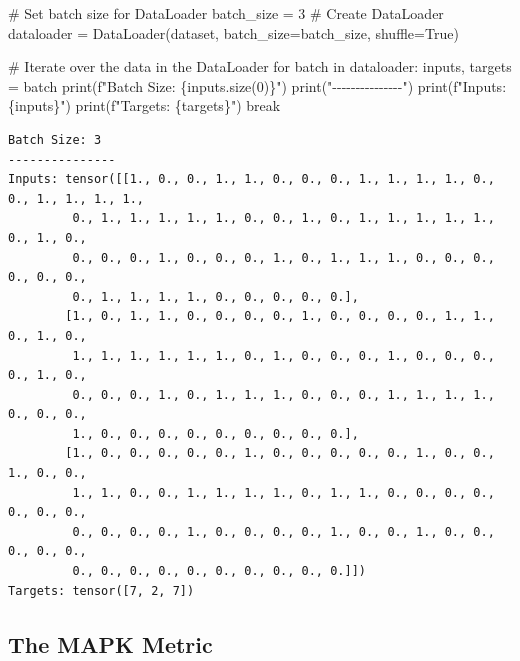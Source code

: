 \documentclass[
  letterpaper,
  DIV=11,
  numbers=noendperiod]{scrreprt}
\newenvironment{Shaded}{\begin{snugshade}}{\end{snugshade}}
\newcommand{\BuiltInTok}[1]{\textcolor[rgb]{0.00,0.23,0.31}{#1}}
\newcommand{\CommentTok}[1]{\textcolor[rgb]{0.37,0.37,0.37}{#1}}
\newcommand{\ControlFlowTok}[1]{\textcolor[rgb]{0.00,0.23,0.31}{#1}}
\newcommand{\DecValTok}[1]{\textcolor[rgb]{0.68,0.00,0.00}{#1}}
\newcommand{\KeywordTok}[1]{\textcolor[rgb]{0.00,0.23,0.31}{#1}}
\newcommand{\NormalTok}[1]{\textcolor[rgb]{0.00,0.23,0.31}{#1}}
\newcommand{\OperatorTok}[1]{\textcolor[rgb]{0.37,0.37,0.37}{#1}}
\newcommand{\SpecialCharTok}[1]{\textcolor[rgb]{0.37,0.37,0.37}{#1}}
\newcommand{\SpecialStringTok}[1]{\textcolor[rgb]{0.13,0.47,0.30}{#1}}
\newcommand{\StringTok}[1]{\textcolor[rgb]{0.13,0.47,0.30}{#1}}
\newcommand{\VariableTok}[1]{\textcolor[rgb]{0.07,0.07,0.07}{#1}}
\begin{document}
\begin{Shaded}
\begin{Highlighting}[]
\CommentTok{\# Set batch size for DataLoader}
\NormalTok{batch\_size }\OperatorTok{=} \DecValTok{3}
\CommentTok{\# Create DataLoader}
\NormalTok{dataloader }\OperatorTok{=}\NormalTok{ DataLoader(dataset, batch\_size}\OperatorTok{=}\NormalTok{batch\_size, shuffle}\OperatorTok{=}\VariableTok{True}\NormalTok{)}

\CommentTok{\# Iterate over the data in the DataLoader}
\ControlFlowTok{for}\NormalTok{ batch }\KeywordTok{in}\NormalTok{ dataloader:}
\NormalTok{    inputs, targets }\OperatorTok{=}\NormalTok{ batch}
    \BuiltInTok{print}\NormalTok{(}\SpecialStringTok{f"Batch Size: }\SpecialCharTok{\{}\NormalTok{inputs}\SpecialCharTok{.}\NormalTok{size(}\DecValTok{0}\NormalTok{)}\SpecialCharTok{\}}\SpecialStringTok{"}\NormalTok{)}
    \BuiltInTok{print}\NormalTok{(}\StringTok{"{-}{-}{-}{-}{-}{-}{-}{-}{-}{-}{-}{-}{-}{-}{-}"}\NormalTok{)}
    \BuiltInTok{print}\NormalTok{(}\SpecialStringTok{f"Inputs: }\SpecialCharTok{\{}\NormalTok{inputs}\SpecialCharTok{\}}\SpecialStringTok{"}\NormalTok{)}
    \BuiltInTok{print}\NormalTok{(}\SpecialStringTok{f"Targets: }\SpecialCharTok{\{}\NormalTok{targets}\SpecialCharTok{\}}\SpecialStringTok{"}\NormalTok{)}
    \ControlFlowTok{break}
\end{Highlighting}
\end{Shaded}

\begin{verbatim}
Batch Size: 3
---------------
Inputs: tensor([[1., 0., 0., 1., 1., 0., 0., 0., 1., 1., 1., 1., 0., 0., 1., 1., 1., 1.,
         0., 1., 1., 1., 1., 1., 0., 0., 1., 0., 1., 1., 1., 1., 1., 0., 1., 0.,
         0., 0., 0., 1., 0., 0., 0., 1., 0., 1., 1., 1., 0., 0., 0., 0., 0., 0.,
         0., 1., 1., 1., 1., 0., 0., 0., 0., 0.],
        [1., 0., 1., 1., 0., 0., 0., 0., 1., 0., 0., 0., 0., 1., 1., 0., 1., 0.,
         1., 1., 1., 1., 1., 1., 0., 1., 0., 0., 0., 1., 0., 0., 0., 0., 1., 0.,
         0., 0., 0., 1., 0., 1., 1., 1., 0., 0., 0., 1., 1., 1., 1., 0., 0., 0.,
         1., 0., 0., 0., 0., 0., 0., 0., 0., 0.],
        [1., 0., 0., 0., 0., 0., 1., 0., 0., 0., 0., 0., 1., 0., 0., 1., 0., 0.,
         1., 1., 0., 0., 1., 1., 1., 1., 0., 1., 1., 0., 0., 0., 0., 0., 0., 0.,
         0., 0., 0., 0., 1., 0., 0., 0., 0., 1., 0., 0., 1., 0., 0., 0., 0., 0.,
         0., 0., 0., 0., 0., 0., 0., 0., 0., 0.]])
Targets: tensor([7, 2, 7])
\end{verbatim}

\hypertarget{sec-the-mapk-metric-31}{%
\subsection{The MAPK Metric}\label{sec-the-mapk-metric-31}}
\end{document}
